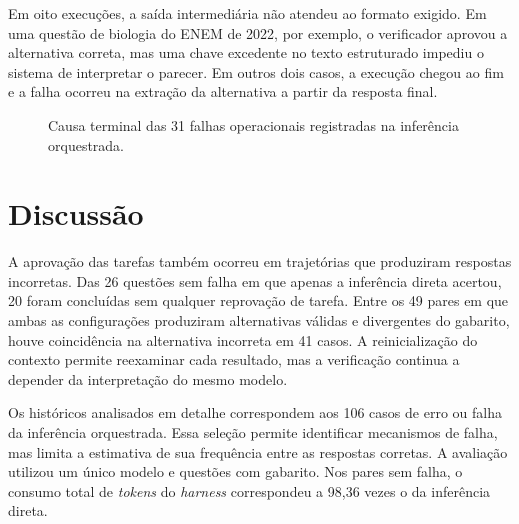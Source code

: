 \documentclass[a4paper,10pt, twocolumn]{article}
\begin{document}
Em oito execuções, a saída intermediária não atendeu ao formato exigido. Em uma questão de biologia do ENEM de 2022, por exemplo, o verificador aprovou a alternativa correta, mas uma chave excedente no texto estruturado impediu o sistema de interpretar o parecer. Em outros dois casos, a execução chegou ao fim e a falha ocorreu na extração da alternativa a partir da resposta final.

\newpage

\begin{figure}[H]
\centering
{}
\caption{Causa terminal das 31 falhas operacionais registradas na inferência orquestrada.}\label{fig:falhas}
\end{figure}

\section{Discussão}

A aprovação das tarefas também ocorreu em trajetórias que produziram respostas incorretas. Das 26 questões sem falha em que apenas a inferência direta acertou, 20 foram concluídas sem qualquer reprovação de tarefa. Entre os 49 pares em que ambas as configurações produziram alternativas válidas e divergentes do gabarito, houve coincidência na alternativa incorreta em 41 casos. A reinicialização do contexto permite reexaminar cada resultado, mas a verificação continua a depender da interpretação do mesmo modelo.

Os históricos analisados em detalhe correspondem aos 106 casos de erro ou falha da inferência orquestrada. Essa seleção permite identificar mecanismos de falha, mas limita a estimativa de sua frequência entre as respostas corretas. A avaliação utilizou um único modelo e questões com gabarito. Nos pares sem falha, o consumo total de \textit{tokens} do \textit{harness} correspondeu a 98,36 vezes o da inferência direta.
\end{document}
